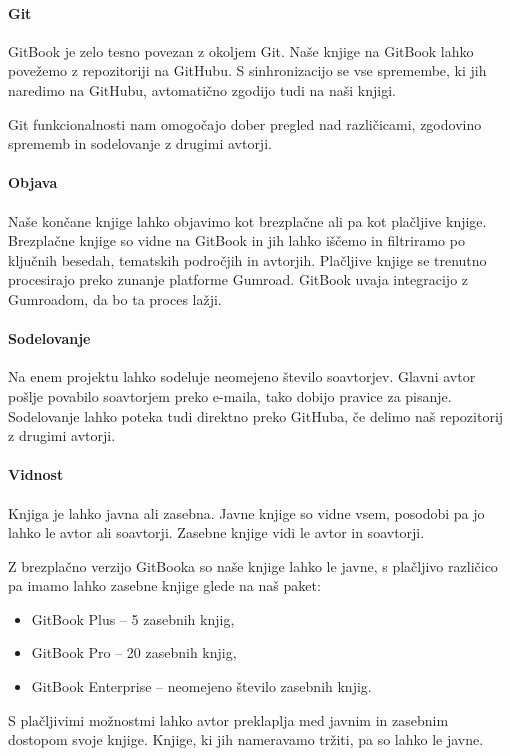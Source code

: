 \documentclass[a4paper, 12pt]{book}
\begin{document}
\paragraph{Git}
GitBook je zelo tesno povezan z okoljem Git. Naše knjige na GitBook lahko povežemo z repozitoriji na GitHubu. S sinhronizacijo se vse spremembe, ki jih naredimo na GitHubu, avtomatično zgodijo tudi na naši knjigi.

Git funkcionalnosti nam omogočajo dober pregled nad različicami, zgodovino sprememb in sodelovanje z drugimi avtorji.

\paragraph{Objava}
Naše končane knjige lahko objavimo kot brezplačne ali pa kot plačljive knjige. Brezplačne knjige so vidne na GitBook in jih lahko iščemo in filtriramo po ključnih besedah, tematskih področjih in avtorjih. Plačljive knjige se trenutno procesirajo preko zunanje platforme Gumroad. GitBook uvaja integracijo z Gumroadom, da bo ta proces lažji.

\paragraph{Sodelovanje}
Na enem projektu lahko sodeluje neomejeno število soavtorjev. Glavni avtor pošlje povabilo soavtorjem preko e-maila, tako dobijo pravice za pisanje. Sodelovanje lahko poteka tudi direktno preko GitHuba, če delimo naš repozitorij z drugimi avtorji.

\paragraph{Vidnost}
Knjiga je lahko javna ali zasebna. Javne knjige so vidne vsem, posodobi pa jo lahko le avtor ali soavtorji. Zasebne knjige vidi le avtor in soavtorji.

Z brezplačno verzijo GitBooka so naše knjige lahko le javne, s plačljivo različico pa imamo lahko zasebne knjige glede na naš paket:
\begin{itemize}
	\item GitBook Plus – 5 zasebnih knjig,
	\item GitBook Pro – 20 zasebnih knjig,
	\item GitBook Enterprise – neomejeno število zasebnih knjig.
\end{itemize}
S plačljivimi možnostmi lahko avtor preklaplja med javnim in zasebnim dostopom svoje knjige. Knjige, ki jih nameravamo tržiti, pa so lahko le javne.
\end{document}
